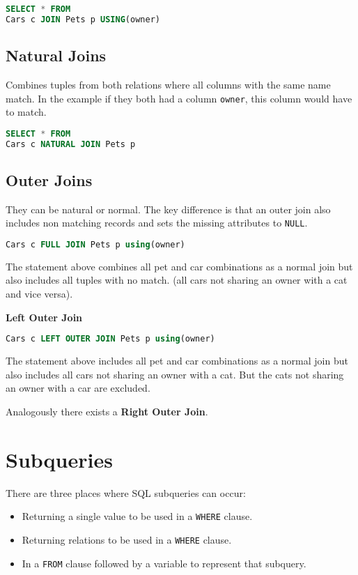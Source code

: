 \documentclass{sciposter}
\renewcommand{\t}[1]{\texttt{#1}}
\begin{document}
\begin{multicols}{3}
\begin{lstlisting}[language=SQL]
SELECT * FROM 
Cars c JOIN Pets p USING(owner)
\end{lstlisting}

\subsection*{Natural Joins}
Combines tuples from both relations where all columns with the same name match. In the example if they both had a column \t{owner}, this column would have to match.
\begin{lstlisting}[language=SQL]
SELECT * FROM 
Cars c NATURAL JOIN Pets p
\end{lstlisting}


\subsection*{Outer Joins}

They can be natural or normal. The key difference is that an outer join also includes non matching records and sets the missing attributes to \t{NULL}.
\begin{lstlisting}[language=SQL]
Cars c FULL JOIN Pets p using(owner)
\end{lstlisting}
The statement above combines all pet and car combinations as a normal join but also includes all tuples with no match. (all cars not sharing an owner with a cat and vice versa).

\textbf{Left Outer Join}
\begin{lstlisting}[language=SQL]
Cars c LEFT OUTER JOIN Pets p using(owner)
\end{lstlisting}
The statement above includes all pet and car combinations as a normal join but also includes all cars not sharing an owner with a cat. But the cats not sharing an owner with a car are excluded.

Analogously there exists a \textbf{Right Outer Join}.

\section*{Subqueries}

There are three places where SQL subqueries can occur:

\begin{itemize}
	\item Returning a single value to be used in a \t{WHERE} clause.
	\item Returning relations to be used in a \t{WHERE} clause.
	\item In a \t{FROM} clause followed by a variable to represent that subquery.
\end{itemize}


\end{multicols}
\end{document}
